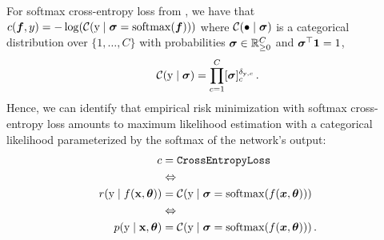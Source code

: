 \begin{example}\label{ex:cross_entropy_loss_probabilistic}
  For softmax cross-entropy loss from , we have that $c({\bm{f}}, y) = - \log( {\mathcal{C}}({\textnormal{y}} \mid {\bm{\sigma}} = \mathrm{softmax}({\bm{f}}) ))$ where ${\mathcal{C}}(\bullet \mid {\bm{\sigma}})$ is a categorical distribution over $\{1, \dots, C\}$ with probabilities ${\bm{\sigma}} \in {\mathbb{R}}^C_{\ge 0}$ and ${\bm{\sigma}}^\top {\bm{1}} = 1$,
  \begin{align*}
    {\mathcal{C}}({\textnormal{y}} \mid {\bm{\sigma}})
    =
    \prod_{c=1}^C [{\bm{\sigma}}]_c^{\delta_{{\textnormal{y}},c}}\,.
  \end{align*}
  Hence, we can identify that empirical risk minimization with softmax cross-entropy loss amounts to maximum likelihood estimation with a categorical likelihood parameterized by the softmax of the network's output:
  \begin{align*}
    c                             & = \text{\texttt{CrossEntropyLoss}}
    \\
                                  & \Leftrightarrow
    \\
    r({\textnormal{y}} \mid f({\mathbf{x}}, {\bm{\theta}})) & = {\mathcal{C}}({\textnormal{y}} \mid {\bm{\sigma}} = \mathrm{softmax}(f({\bm{x}}, {\bm{\theta}})))\,
    \\
                                  & \Leftrightarrow
    \\
    p({\textnormal{y}} \mid {\mathbf{x}}, {\bm{\theta}})    & = {\mathcal{C}}({\textnormal{y}} \mid {\bm{\sigma}} = \mathrm{softmax}(f({\bm{x}}, {\bm{\theta}})))\,.
  \end{align*}
\end{example}

\switchcolumn[0]
